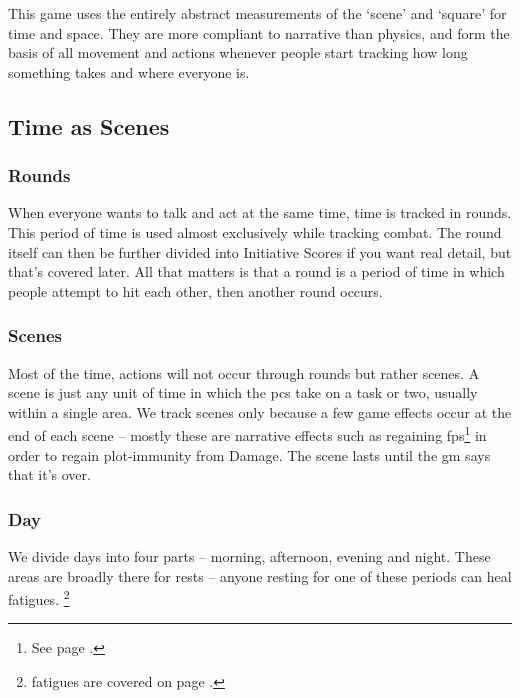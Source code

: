 \begin{multicols}{2}

\noindent
This game uses the entirely abstract measurements of the `scene' and `square' for time and space. They are more compliant to narrative than physics, and form the basis of all movement and actions whenever people start tracking how long something takes and where everyone is.

\subsection{Time as Scenes}
\label{time}

\subsubsection{Rounds}

When everyone wants to talk and act at the same time, time is tracked in \glspl{round}.
This period of time is used almost exclusively while tracking combat.
The \gls{round} itself can then be further divided into Initiative Scores if you want real detail, but that's covered later.
All that matters is that a \gls{round} is a period of time in which people attempt to hit each other, then another \gls{round} occurs.

\subsubsection{Scenes}

Most of the time, actions will not occur through \glspl{round} but rather scenes. A scene is just any unit of time in which the \glspl{pc} take on a task or two, usually within a single area. We track scenes only because a few game effects occur at the end of each scene -- mostly these are narrative effects such as regaining \glspl{fp}\footnote{See page \pageref{fate_points}.} in order to regain plot-immunity from Damage. The scene lasts until the \gls{gm} says that it's over.

\subsubsection{Day}

We divide days into four parts -- morning, afternoon, evening and night.
These areas are broadly there for rests -- anyone resting for one of these periods can heal \glspl{fatigue}.%
\footnote{\Glspl{fatigue} are covered on page \pageref{fatigue}.}


\end{multicols}
